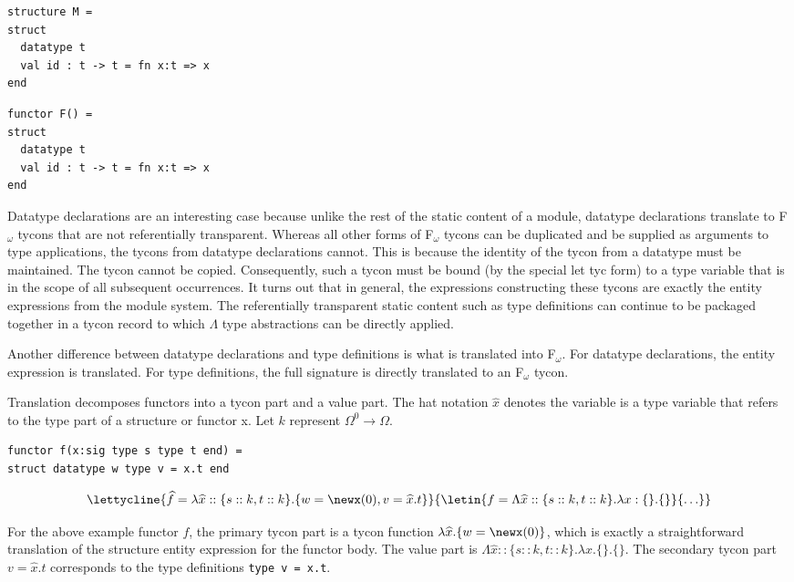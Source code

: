 \documentclass[9pt,nocopyrightspace, fleqn]{sigplanconf}
\begin{document}
\begin{lstlisting}
structure M = 
struct 
  datatype t
  val id : t -> t = fn x:t => x
end
\end{lstlisting}

\begin{lstlisting}
functor F() = 
struct
  datatype t
  val id : t -> t = fn x:t => x
end
\end{lstlisting}

Datatype declarations are an interesting case because unlike the rest
of the static content of a module, datatype declarations translate to
F$_\omega$ tycons that are not referentially transparent. Whereas all
other forms of F$_\omega$ tycons can be duplicated and be supplied as
arguments to type applications, the tycons from datatype declarations
cannot. This is because the identity of the tycon from a datatype must
be maintained. The tycon cannot be copied. Consequently, such a tycon
must be bound (by the special let tyc form) to a type variable that is
in the scope of all subsequent occurrences. It turns out that in
general, the expressions constructing these tycons are exactly the
entity expressions from the module system. The referentially
transparent static content such as type definitions can continue to be packaged together in a tycon record to which $\Lambda$ type abstractions can
be directly applied. 

Another difference between datatype declarations and type definitions
is what is translated into F$_\omega$. For datatype declarations, the
entity expression is translated. For type definitions, the full
signature is directly translated to an F$_\omega$ tycon. 

Translation decomposes functors into a tycon part and a value
part. The hat notation $\widehat{x}$ denotes the variable is a type
variable that refers to the type part of a structure or functor x. Let
$k$ represent $\Omega^0 \to \Omega$. 

\begin{lstlisting}
functor f(x:sig type s type t end) = 
struct datatype w type v = x.t end
\end{lstlisting}
\[\lettycline{\widehat{f}=\lambda \widehat{x}::\{s::k,t::k\}.\{w =
  \newx(0), v=\widehat{x}.t \}}
{\letin{f = \Lambda\widehat{x}::\{s::k, 
t:: k
    \}.\lambda x:\{\}.\{\}}
 {\ldots}}
\]

For the above example functor $f$, the primary tycon part is a tycon
function $\lambda \widehat{x}
. \{w = \newx(0) \}$, which is exactly a straightforward
translation of the structure entity expression for the functor
body. The value part is $\Lambda\widehat{x}::\{s::k, 
t :: k \}.\lambda x.\{\}.\{\}$. The
secondary tycon part $v = \widehat{x}.t$ corresponds to the type definitions
\lstinline{type v = x.t}.
\end{document}
